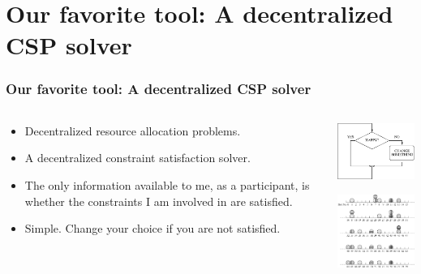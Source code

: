 \documentclass{beamer}
\begin{document}
\section{Our favorite tool: A decentralized CSP solver}
\begin{frame}
  \frametitle{Our favorite tool: A decentralized CSP solver}
  \begin{columns}[t]
      \begin{block}{}
        \begin{itemize}
          \item Decentralized resource allocation problems.
          \item A decentralized constraint satisfaction solver.
          \item The only information available to me, as a participant, is whether the constraints I am involved in are satisfied.
          \item Simple. Change your choice if you are not satisfied.
        \end{itemize}
      \end{block}
      \begin{center}
        \includegraphics[width=1.5in]{figures/happy}

        \includegraphics[width=1.8in]{figures/csma_eca_compact}
      \end{center}
  \end{columns}
\end{frame}
\end{document}
